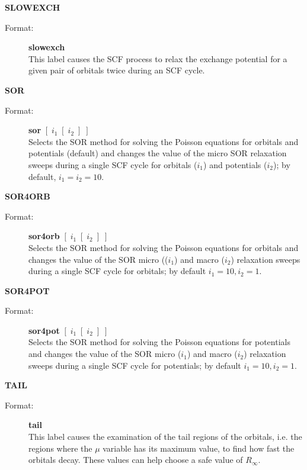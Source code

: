 \documentclass[10pt,a4paper]{article}
\begin{document}
\begin{description}
\item \textbf{SLOWEXCH}
\begin{description}
\item[Format:] \textbf{slowexch} \\
   This label causes the SCF process to relax the exchange potential for a given pair of
   orbitals twice during an SCF cycle.
\end{description}

\item \textbf{SOR}
\begin{description}
\item[Format:] \textbf{sor} $[\;i_1\;[\;i_2\;]\;]$\\
  Selects the SOR method for solving the Poisson equations for orbitals and
  potentials (default) and changes the value of the micro SOR relaxation
  sweeps during a single SCF cycle for orbitals ($i_1$) and potentials
  ($i_2$); by default, $i_1=i_2=10$.
\end{description}

\item \textbf{SOR4ORB}
\begin{description}
\item[Format:] \textbf{sor4orb} $[\;i_1\;[\;i_2\;]\;]$\\
  Selects the SOR method for solving the Poisson equations for orbitals and
  changes the value of the SOR micro (($i_1$) and macro ($i_2$) relaxation
  sweeps during a single SCF cycle for orbitals; by default $i_1=10, i_2=1$.
\end{description}

\item \textbf{SOR4POT}
\begin{description}
\item[Format:] \textbf{sor4pot} $[\;i_1\;[\;i_2\;]\;]$\\
  Selects the SOR method for solving the Poisson equations for potentials
  and changes the value of the SOR micro ($i_1$) and macro ($i_2$)
  relaxation sweeps during a single SCF cycle for potentials; by default
  $i_1=10, i_2=1$.
\end{description}

\item \textbf{TAIL}
\begin{description}
\item[Format:] \textbf{tail} \\ This label causes the examination of the
  tail regions of the orbitals, i.e. the regions where the $\mu$ variable
  has its maximum value, to find how fast the orbitals decay. These values
  can help choose a safe value of $R_{\infty}$.
\end{description}



\end{description}
\end{document}
